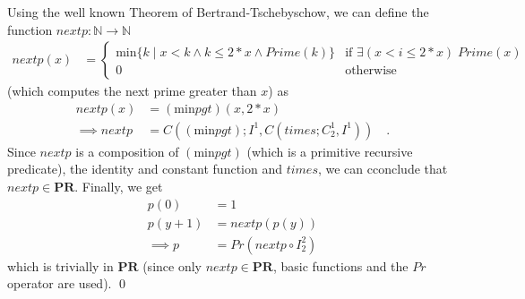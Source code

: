 \documentclass [11pt]{article}
\newcommand{\PR}{\textbf{PR}}
\begin{document}
\noindent
Using the well known Theorem of Bertrand-Tschebyschow, we can define the function $nextp: \mathbb{N} \rightarrow \mathbb{N}$
\begin{align*}
nextp(x) &= 
\begin{cases}
  \text{min}\{k \mid x < k \land k \leq 2*x \land Prime(k) \} & \text{if }\exists(x < i \leq 2*x)\; Prime(x)\\
  0 & \text{otherwise}
\end{cases}
\end{align*}
(which computes the next prime greater than $x$) as
\begin{align*}
nextp(x) &= (\text{min}pgt)(x, 2*x)\\
\implies nextp &= C((\text{min}pgt); I^1, C(times; C^1_2, I^1)) \quad .
\end{align*}
Since $nextp$ is a composition of $(\text{min}pgt)$ (which is a primitive recursive predicate), the identity and constant function and $times$, we can cconclude that $nextp \in \PR$.
Finally, we get 
\begin{align*}
p(0) &= 1 \\
p(y+1) &= nextp(p(y)) \\
\implies p &=  Pr(nextp \circ I^2_2)
\end{align*}
which is trivially in $\PR$ (since only $nextp \in \PR$, basic functions and the $Pr$ operator are used).
\qed
\end{document}
